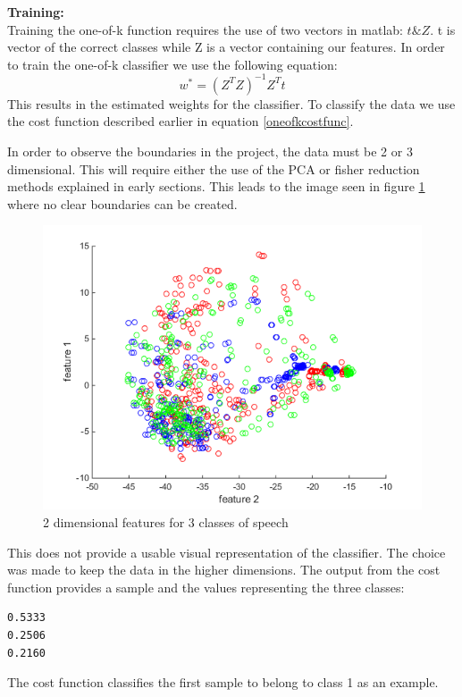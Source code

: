\textbf{Training:}\\
Training the one-of-k function requires the use of two vectors in matlab: $t \& Z$. t is vector of the correct classes while Z is a vector containing our features. In order to train the one-of-k classifier we use the following equation:
\begin{equation}
w^* = (Z^T Z)^{-1} Z^T t
\end{equation}
This results in the estimated weights for the classifier. To classify the data we use the cost function described earlier in equation \ref{oneofkcostfunc}.

In order to observe the boundaries in the project, the data must be 2 or 3 dimensional. This will require either the use of the PCA or fisher reduction methods explained in early sections. This leads to the image seen in figure \ref{2dimoneofk} where no clear boundaries can be created.
\begin{figure}[H]
\centering
\includegraphics[scale=0.5]{billeder/2dimoneofk}
\caption{2 dimensional features for 3 classes of speech}
\label{2dimoneofk}
\end{figure}
This does not provide a usable visual representation of the classifier. The choice was made to keep the data in the higher dimensions. The output from the cost function provides a sample and the values representing the three classes:
\begin{verbatim}
0.5333
0.2506
0.2160
\end{verbatim}
The cost function classifies the first sample to belong to class 1 as an example.

